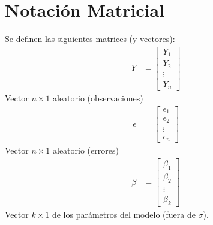\documentclass[10pt]{article}
\theoremstyle{plain}
\theoremstyle{definition}
\begin{document}
 \section{Notación Matricial}
 Se definen las siguientes matrices (y vectores):
 \begin{align*}
    Y &= \begin{bmatrix}
           Y_{1} \\
           Y_{2} \\
           \vdots \\
           Y_{n}
         \end{bmatrix}
  \end{align*}
  Vector $n\times 1$ aleatorio (observaciones)
  \begin{align*}
    \epsilon &= \begin{bmatrix}
           \epsilon_{1} \\
           \epsilon_{2} \\
           \vdots \\
           \epsilon_{n}
         \end{bmatrix}
  \end{align*}
  Vector $n\times 1$ aleatorio (errores)
    \begin{align*}
    \beta &= \begin{bmatrix}
           \beta_{1} \\
           \beta_{2} \\
           \vdots \\
           \beta_{k}
         \end{bmatrix}
  \end{align*}
  Vector $k\times 1$ de los parámetros del modelo (fuera de $\sigma$).\\
  
\end{document}
